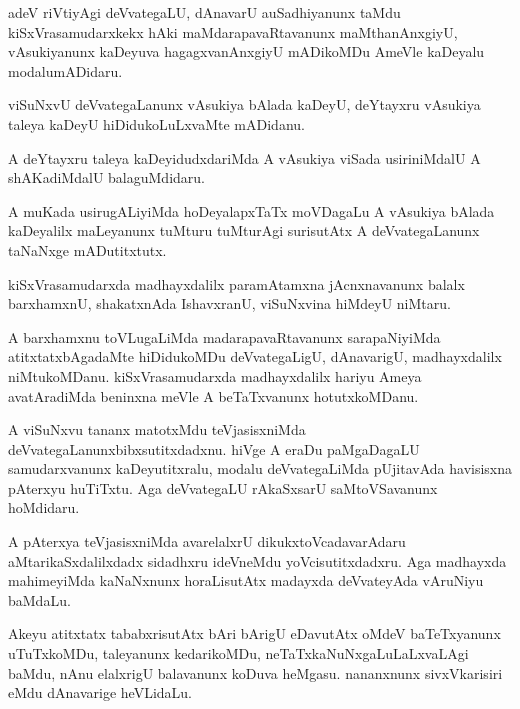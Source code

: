 \documentclass{article}
\begin{document}
\begin{mn}%
adeV riVtiyAgi deVvategaLU, dAnavarU auSadhiyanunx taMdu
kiSxVrasamudarxkekx hAki maMdarapavaRtavanunx maMthanAnxgiyU,
vAsukiyanunx kaDeyuva hagagxvanAnxgiyU mADikoMDu AmeVle kaDeyalu modalumADidaru.
\end{mn}

\begin{mn}
viSuNxvU deVvategaLanunx vAsukiya bAlada kaDeyU, deYtayxru vAsukiya
taleya kaDeyU hiDidukoLuLxvaMte mADidanu.
\end{mn}

\begin{mn}
A deYtayxru taleya kaDeyidudxdariMda A vAsukiya viSada usiriniMdalU A
shAKadiMdalU balaguMdidaru.
\end{mn}

\begin{mn}
A muKada usirugALiyiMda hoDeyalapxTaTx moVDagaLu A vAsukiya bAlada
kaDeyalilx maLeyanunx tuMturu tuMturAgi surisutAtx A deVvategaLanunx
taNaNxge mADutitxtutx.
\end{mn}

\begin{mn}%
kiSxVrasamudarxda madhayxdalilx paramAtamxna jAcnxnavanunx balalx
barxhamxnU, shakatxnAda IshavxranU, viSuNxvina hiMdeyU niMtaru.
\end{mn}

\begin{mn}%
A barxhamxnu toVLugaLiMda madarapavaRtavanunx sarapaNiyiMda
atitxtatxbAgadaMte hiDidukoMDu deVvategaLigU, dAnavarigU,
madhayxdalilx niMtukoMDanu. kiSxVrasamudarxda madhayxdalilx hariyu
Ameya avatAradiMda beninxna meVle A beTaTxvanunx hotutxkoMDanu.
\end{mn}

\begin{mn}%
A viSuNxvu tananx matotxMdu teVjasisxniMda
deVvategaLanunxbibxsutitxdadxnu. hiVge A eraDu paMgaDagaLU
samudarxvanunx kaDeyutitxralu, modalu deVvategaLiMda pUjitavAda
havisisxna pAterxyu huTiTxtu. Aga deVvategaLU rAkaSxsarU
saMtoVSavanunx hoMdidaru.
\end{mn}

\begin{mn}
A pAterxya teVjasisxniMda avarelalxrU dikukxtoVcadavarAdaru
aMtarikaSxdalilxdadx sidadhxru ideVneMdu yoVcisutitxdadxru. Aga
madhayxda mahimeyiMda kaNaNxnunx horaLisutAtx madayxda deVvateyAda
vAruNiyu baMdaLu.
\end{mn}

\begin{mn}%
Akeyu atitxtatx tababxrisutAtx bAri bArigU eDavutAtx oMdeV
baTeTxyanunx uTuTxkoMDu, taleyanunx kedarikoMDu,
neTaTxkaNuNxgaLuLaLxvaLAgi baMdu, nAnu elalxrigU balavanunx koDuva
heMgasu. nananxnunx sivxVkarisiri eMdu dAnavarige heVLidaLu.
\end{mn}
\end{document}
